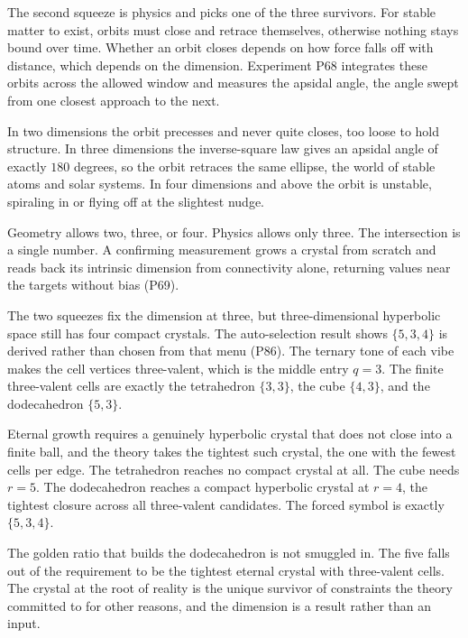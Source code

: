 The second squeeze is physics and picks one of the three survivors. For stable matter to exist, orbits must
close and retrace themselves, otherwise nothing stays bound over time. Whether an orbit closes depends on
how force falls off with distance, which depends on the dimension. Experiment P68 integrates these orbits
across the allowed window and measures the apsidal angle, the angle swept from one closest approach to the
next.

In two dimensions the orbit precesses and never quite closes, too loose to hold structure. In three
dimensions the inverse-square law gives an apsidal angle of exactly $180$ degrees, so the orbit retraces the
same ellipse, the world of stable atoms and solar systems. In four dimensions and above the orbit is
unstable, spiraling in or flying off at the slightest nudge.

Geometry allows two, three, or four. Physics allows only three. The intersection is a single number. A
confirming measurement grows a crystal from scratch and reads back its intrinsic dimension from connectivity
alone, returning values near the targets without bias (P69).

The two squeezes fix the dimension at three, but three-dimensional hyperbolic space still has four compact
crystals. The auto-selection result shows $\{5,3,4\}$ is derived rather than chosen from that menu (P86).
The ternary tone of each vibe makes the cell vertices three-valent, which is the middle entry $q = 3$. The
finite three-valent cells are exactly the tetrahedron $\{3,3\}$, the cube $\{4,3\}$, and the dodecahedron
$\{5,3\}$.

Eternal growth requires a genuinely hyperbolic crystal that does not close into a finite ball, and the
theory takes the tightest such crystal, the one with the fewest cells per edge. The tetrahedron reaches no
compact crystal at all. The cube needs $r = 5$. The dodecahedron reaches a compact hyperbolic crystal at
$r = 4$, the tightest closure across all three-valent candidates. The forced symbol is exactly $\{5,3,4\}$.

The golden ratio that builds the dodecahedron is not smuggled in. The five falls out of the requirement to
be the tightest eternal crystal with three-valent cells. The crystal at the root of reality is the unique
survivor of constraints the theory committed to for other reasons, and the dimension is a result rather than
an input.
